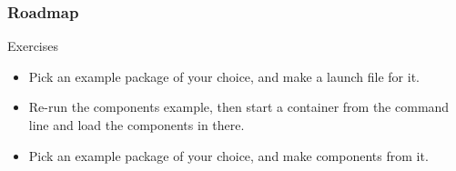\documentclass[aspectratio=169]{beamer}
\begin{document}
\frame{\titlepage}



\begin{frame}
\frametitle{Roadmap}
\tableofcontents
\end{frame}









\begin{frame}{Exercises}
  \begin{itemize}
    \item Pick an example package of your choice, and make a launch file for it.
    \item Re-run the components example, then start a container from the command line and load the components in there.
    \item Pick an example package of your choice, and make components from it.
  \end{itemize}
\end{frame}
\end{document}
